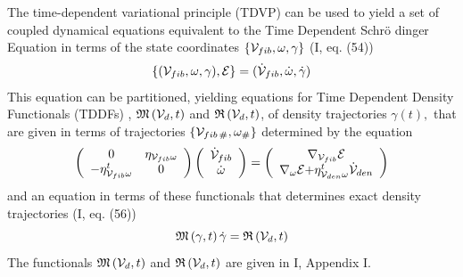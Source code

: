 The time-dependent variational principle (TDVP) can be used to yield a set
of coupled dynamical equations equivalent to the Time Dependent Schr\"{o}%
dinger Equation in terms of the state coordinates $\left\{ {\cal V}%
_{fib},\omega ,{\cal \gamma }\right\} $ (I, eq. (54)) 
\begin{equation}
\{({\cal V}_{fib},\omega ,\gamma ),{\cal E}\}=({\cal \dot{V}}_{fib},\dot{%
\omega},\dot{\gamma})  \label{Vomegagammaeom}
\end{equation}%
This equation can be partitioned, yielding equations for Time Dependent
Density Functionals (TDDFs) , ${\frak M}\left( {\cal V}_{d},t\right) $ and $%
{\frak R}\left( {\cal V}_{d},t\right) $, of density trajectories $\gamma
\left( t\right) ,$ that are given in terms of trajectories $\left\{ {\cal V}%
_{fib\,\#},\omega _{\#}\right\} $ determined by the equation 
\begin{equation}
\left( 
\begin{array}{cc}
0 & \eta _{{\cal V}_{fib}\omega } \\ 
-\eta _{{\cal V}_{fib}\omega }^{t} & 0%
\end{array}%
\right) \left( 
\begin{array}{c}
{\cal \dot{V}}_{fib} \\ 
\dot{\omega}%
\end{array}%
\right) =\left( 
\begin{array}{c}
\nabla _{{\cal V}_{fib}}{\cal E} \\ 
\nabla _{\omega }{\cal E+}\eta _{{\cal V}_{den}\omega }^{t}{\cal \dot{V}}%
_{den}%
\end{array}%
\right)
\end{equation}
and an equation in terms of these functionals that determines exact density
trajectories (I, eq. (56)) 
\begin{equation}
{\frak M}\left( {\cal \gamma },t\right) \dot{\gamma}={\frak R}\left( {\cal V}%
_{d},t\right)  \label{gammadot2}
\end{equation}%
The functionals ${\frak M}\left( {\cal V}_{d},t\right) $ and ${\frak R}%
\left( {\cal V}_{d},t\right) $ are given in I, Appendix I.

